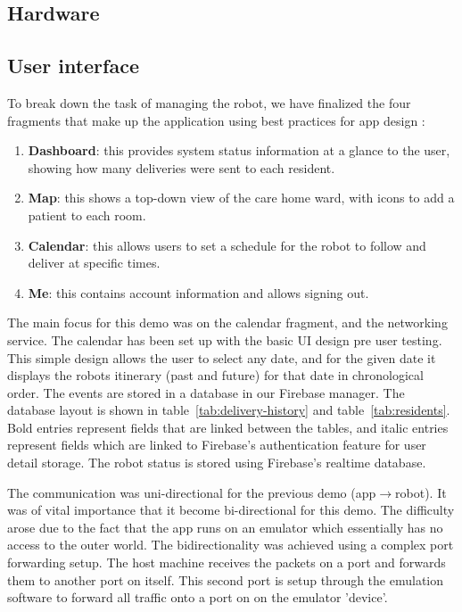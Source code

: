 \documentclass{article}
\begin{document}
\subsection{Hardware}

\subsection{User interface}
To break down the task of managing the robot, we have finalized the four fragments that make up the application using best practices for app design \cite{design, ux}:
\begin{enumerate}
  \item {\bf Dashboard}: this provides system status information at a glance to the user, showing how many deliveries were sent to each resident.
  \item {\bf Map}: this shows a top-down view of the care home ward, with icons to add a patient to each room.
  \item {\bf Calendar}: this allows users to set a schedule for the robot to follow and deliver at specific times.
  \item {\bf Me}: this contains account information and allows signing out. 
\end{enumerate}

The main focus for this demo was on the calendar fragment, and the networking service. The calendar has been set up with the basic UI design pre user testing. This simple design allows the user to select any date, and for the given date it displays the robots itinerary (past and future) for that date in chronological order. The events are stored in a database in our Firebase manager. The database layout is shown in table~\ref{tab:delivery-history} and table~\ref{tab:residents}. Bold entries represent fields that are linked between the tables, and italic entries represent fields which are linked to Firebase's authentication feature for user detail storage. The robot status is stored using Firebase's realtime database.

The communication was uni-directional for the previous demo (app$\rightarrow$robot). It was of vital importance that it become bi-directional for this demo. The difficulty arose due to the fact that the app runs on an emulator which essentially has no access to the outer world. The bidirectionality was achieved using a complex port forwarding setup. The host machine receives the packets on a port and forwards them to another port on itself. This second port is setup through the emulation software to forward all traffic onto a port on on the emulator 'device'.
\end{document}
